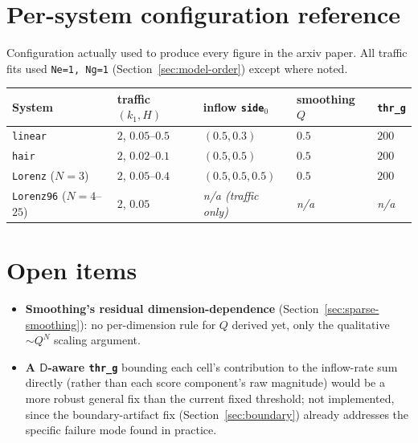 \documentclass[11pt]{article}
\newcommand{\MD}{{\mathsf{D}}}
\begin{document}
\section{Per-system configuration reference}
\label{sec:configtable}

Configuration actually used to produce every figure in the arxiv paper. All traffic fits used \texttt{Ne=1, Ng=1} (Section~\ref{sec:model-order}) except where noted.

\begin{center}
\small
\begin{tabular}{@{}lllll@{}}
\toprule
System & traffic $(k_1, H)$ & inflow \texttt{side}$_0$ & smoothing $Q$ & \texttt{thr\_g} \\
\midrule
\texttt{linear} & $2$, $0.05$--$0.5$ & $(0.5, 0.3)$ & $0.5$ & $200$ \\
\texttt{hair} & $2$, $0.02$--$0.1$ & $(0.5, 0.5)$ & $0.5$ & $200$ \\
\texttt{Lorenz} ($N{=}3$) & $2$, $0.05$--$0.4$ & $(0.5,0.5,0.5)$ & $0.5$ & $200$ \\
\texttt{Lorenz96} ($N{=}4$--$25$) & $2$, $0.05$ & \emph{n/a (traffic only)} & \emph{n/a} & \emph{n/a} \\
\bottomrule
\end{tabular}
\end{center}

\section{Open items}
\label{sec:open}

\begin{itemize}
\item \textbf{Smoothing's residual dimension-dependence} (Section~\ref{sec:sparse-smoothing}): no per-dimension rule for $Q$ derived yet, only the qualitative $\sim Q^N$ scaling argument.
\item \textbf{A $\MD$-aware \texttt{thr\_g}} bounding each cell's contribution to the inflow-rate sum directly (rather than each score component's raw magnitude) would be a more robust general fix than the current fixed threshold; not implemented, since the boundary-artifact fix (Section~\ref{sec:boundary}) already addresses the specific failure mode found in practice.
\end{itemize}
\end{document}
